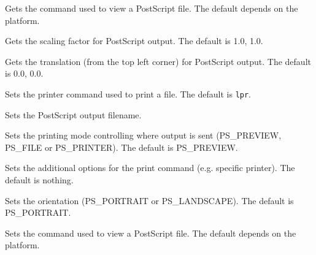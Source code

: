 
Gets the command used to view a PostScript file. The default depends on the platform.



Gets the scaling factor for PostScript output. The default is 1.0, 1.0.



Gets the translation (from the top left corner) for PostScript output. The default is 0.0, 0.0.



Sets the printer command used to print a file. The default is {\tt lpr}.



Sets the PostScript output filename.



Sets the printing mode controlling where output is sent (PS\_PREVIEW, PS\_FILE or PS\_PRINTER).
The default is PS\_PREVIEW.



Sets the additional options for the print command (e.g. specific printer). The default is nothing.



Sets the orientation (PS\_PORTRAIT or PS\_LANDSCAPE). The default is PS\_PORTRAIT.



Sets the command used to view a PostScript file. The default depends on the platform.


